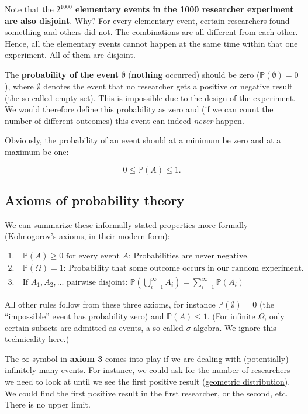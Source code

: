 \documentclass[
]{book}
\begin{document}
Note that the \textbf{\(2^{1000}\) elementary events in the 1000 researcher experiment are also disjoint}. Why? For every elementary event,
certain researchers found something and others did not. The combinations are all different from each other. Hence,
all the elementary events cannot happen at the same time within that one experiment. All of them are disjoint.

The \textbf{probability of the event} \(\emptyset\) (\textbf{nothing} occurred) should be zero (\(\mathbb{P}(\emptyset)=0\)), where \(\emptyset\) denotes
the event that no researcher gets a positive or negative result (the so-called empty set).
This is impossible due to the design of the experiment.
We would therefore define this probability as zero and (if we can count the number of different outcomes)
this event can indeed \emph{never} happen.

Obviously, the probability of an event should at a minimum be zero and at a maximum be one:

\[0 \le \mathbb{P}(A) \le 1.\]

\subsection{Axioms of probability theory}\label{axioms_of_probability_theory}

We can summarize these informally stated properties more formally (Kolmogorov's axioms, in their modern form):

\begin{align}
1. &\ \mathbb{P}(A) \ge 0 \text{ for every event } A \text{: Probabilities are never negative.}\\
2. &\ \mathbb{P}(\Omega) = 1 \text{: Probability that some outcome occurs in our random experiment.}\\
3. &\ \text{If } A_1, A_2,... \text{ pairwise disjoint: } \mathbb{P}\left(\bigcup_{i=1}^{\infty} A_i\right) = \sum_{i=1}^{\infty} \mathbb{P}(A_i)
\end{align}

All other rules follow from these three axioms, for instance \(\mathbb{P}(\emptyset) = 0\) (the ``impossible'' event has probability zero) and \(\mathbb{P}(A) \le 1\). (For infinite \(\Omega\), only certain subsets are admitted as events, a so-called \(\sigma\)-algebra. We ignore this technicality here.)

The \(\infty\)-symbol in \textbf{axiom 3} comes into play if we are dealing with (potentially) infinitely many events.
For instance, we could ask for the number of researchers we need to look at until we see the first
positive result (\href{https://en.wikipedia.org/wiki/Geometric_distribution}{geometric distribution}).
We could find the first positive result in the first researcher, or the second, etc. There is no upper limit.
\end{document}
